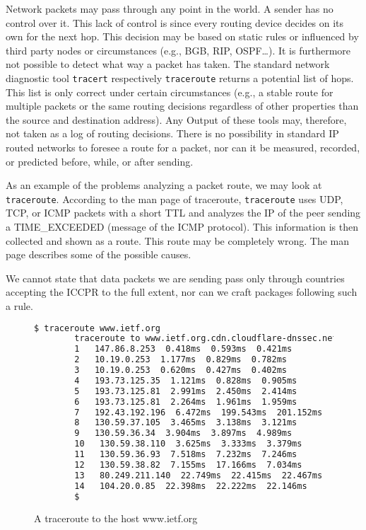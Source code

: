 Network packets may pass through any point in the world. A sender has no control over it. This lack of control is since every routing device decides on its own for the next hop. This decision may be based on static rules or influenced by third party nodes or circumstances (e.g., BGB, RIP, OSPF\ldots). It is furthermore not possible to detect what way a packet has taken. The standard network diagnostic tool \verb|tracert| respectively \verb|traceroute| returns a potential list of hops. This list is only correct under certain circumstances (e.g., a stable route for multiple packets or the same routing decisions regardless of other properties than the source and destination address). Any Output of these tools may, therefore, not taken as a log of routing decisions. There is no possibility in standard IP routed networks to foresee a route for a packet, nor can it be measured, recorded, or predicted before, while, or after sending. 

As an example of the problems analyzing a packet route, we may look at \verb|traceroute|. According to the man page of traceroute, \verb|traceroute| uses UDP, TCP, or ICMP packets with a short TTL and analyzes the IP of the peer sending a TIME\_EXCEEDED (message of the ICMP protocol). This information is then collected and shown as a route. This route may be completely wrong. The man page describes some of the possible causes.

We cannot state that data packets we are sending pass only through countries accepting the ICCPR to the full extent, nor can we craft packages following such a rule.

\begin{figure}[H]
	\begin{lstlisting}[language=bash,breaklines=true,basicstyle=\tiny]
		$ traceroute www.ietf.org
		traceroute to www.ietf.org.cdn.cloudflare-dnssec.net (104.20.0.85), 64 hops max
		1   147.86.8.253  0.418ms  0.593ms  0.421ms
		2   10.19.0.253  1.177ms  0.829ms  0.782ms
		3   10.19.0.253  0.620ms  0.427ms  0.402ms
		4   193.73.125.35  1.121ms  0.828ms  0.905ms
		5   193.73.125.81  2.991ms  2.450ms  2.414ms
		6   193.73.125.81  2.264ms  1.961ms  1.959ms
		7   192.43.192.196  6.472ms  199.543ms  201.152ms
		8   130.59.37.105  3.465ms  3.138ms  3.121ms
		9   130.59.36.34  3.904ms  3.897ms  4.989ms
		10   130.59.38.110  3.625ms  3.333ms  3.379ms
		11   130.59.36.93  7.518ms  7.232ms  7.246ms
		12   130.59.38.82  7.155ms  17.166ms  7.034ms
		13   80.249.211.140  22.749ms  22.415ms  22.467ms
		14   104.20.0.85  22.398ms  22.222ms  22.146ms
		$
	\end{lstlisting}
	\caption{A traceroute to the host www.ietf.org}
\end{figure}

